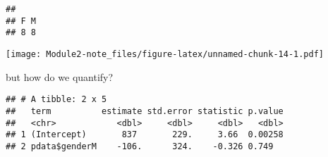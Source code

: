 \documentclass[]{article}
\newenvironment{Shaded}{\begin{snugshade}}{\end{snugshade}}
\newcommand{\KeywordTok}[1]{\textcolor[rgb]{0.13,0.29,0.53}{\textbf{#1}}}
\newcommand{\DataTypeTok}[1]{\textcolor[rgb]{0.13,0.29,0.53}{#1}}
\newcommand{\DecValTok}[1]{\textcolor[rgb]{0.00,0.00,0.81}{#1}}
\newcommand{\StringTok}[1]{\textcolor[rgb]{0.31,0.60,0.02}{#1}}
\newcommand{\OperatorTok}[1]{\textcolor[rgb]{0.81,0.36,0.00}{\textbf{#1}}}
\newcommand{\NormalTok}[1]{#1}
\begin{document}
\begin{verbatim}
## 
## F M 
## 8 8
\end{verbatim}

\begin{Shaded}
\end{Shaded}

\texttt{[image: Module2-note\_files/figure-latex/unnamed-chunk-14-1.pdf]}

but how do we quantify?

\begin{Shaded}
\end{Shaded}

\begin{verbatim}
## # A tibble: 2 x 5
##   term          estimate std.error statistic p.value
##   <chr>            <dbl>     <dbl>     <dbl>   <dbl>
## 1 (Intercept)       837       229.     3.66  0.00258
## 2 pdata$genderM    -106.      324.    -0.326 0.749
\end{verbatim}

\begin{Shaded}
\end{Shaded}
\end{document}
